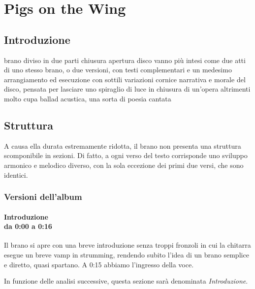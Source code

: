 \documentclass[class=book, crop=false, oneside, 12pt]{standalone}
\begin{document}
    \chapter{Pigs on the Wing}
    
    \section{Introduzione}
    \label{sec:03-intro}
    brano diviso in due parti chiusura apertura disco
    vanno più intesi come due atti di uno stesso brano, o due versioni, con testi complementari e un medesimo arrangiamento ed esecuzione con sottili variazioni
    cornice narrativa e morale del disco, pensata per lasciare uno spiraglio di luce in chiusura di un'opera altrimenti molto cupa
    ballad acustica, una sorta di poesia cantata
    
    \section{Struttura}
    \label{sec:03-structure}
    A causa ella durata estremamente ridotta, il brano non presenta una struttura scomponibile in sezioni. Di fatto, a ogni verso del testo corrisponde uno sviluppo armonico e melodico diverso, con la sola eccezione dei primi due versi, che sono identici. 
    
    \subsection{Versioni dell'album}
    
    \subsubsection*{Introduzione\\ \small{da 0:00 a 0:16}}
    Il brano si apre con una breve introduzione senza troppi fronzoli in cui la chitarra esegue un breve vamp in strumming, rendendo subito l'idea di un brano semplice e diretto, quasi spartano. A 0:15 abbiamo l'ingresso della voce.
    
    In funzione delle analisi successive, questa sezione sarà denominata \emph{Introduzione}.
\end{document}
